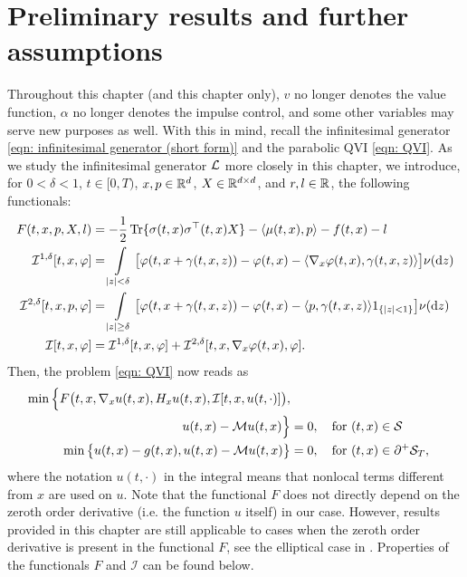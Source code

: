 \section{Preliminary results and further assumptions}
\label{section: Preliminary Results for the Proof of Uniqueness}
Throughout this chapter (and this chapter only), $v$ no longer denotes the value function, $\alpha$ no longer denotes the impulse control, and some other variables may serve new purposes as well. With this in mind, recall the infinitesimal generator \eqref{eqn: infinitesimal generator (short form)} and the parabolic QVI \eqref{eqn: QVI}. As we study the infinitesimal generator $\mathcal{L}$ more closely in this chapter, we introduce, for $0<\delta<1$, $t \in [0,T)$, $x,p \in \mathbb{R}^d$, $X \in \mathbb{R}^{d \times d}$, and $r,l \in \mathbb{R}$, the following functionals:
\begin{align}
    F(t,x,p,X,l) &= - \frac{1}{2} \operatorname{Tr}\{ \sigma (t,x) \sigma^\top (t,x) X \} - \langle \mu (t,x), p \rangle - f(t,x) - l \label{eqn: functional F} \\
    \mathcal{I}^{1,\delta}[t,x,\varphi] &= \int\limits_{|z|<\delta} \big[ \varphi(t,x+\gamma(t,x,z)) - \varphi(t,x) - \langle \nabla_x \varphi (t,x), \gamma(t,x,z) \rangle \big] \nu(\mathrm{d} z) \label{eqn: functional I1} \\
    \mathcal{I}^{2,\delta}[t,x,p,\varphi] &= \int\limits_{|z|\geq \delta} \big[ \varphi(t,x+\gamma(t,x,z)) - \varphi(t,x) - \langle p, \gamma(t,x,z) \rangle 1_{\left\{|z|<1\right\}} \big] \nu(\mathrm{d} z) \label{eqn: functional I2} \\
    \mathcal{I}[t,x,\varphi] &= \mathcal I^{1,\delta}[t,x,\varphi] + \mathcal  I^{2,\delta}[t,x,\nabla_x \varphi(t,x),\varphi]. \label{eqn: functional I} 
\end{align}
Then, the problem \ref{eqn: QVI} now reads as
\begin{align}
    \min \Big \{ F\big(t,x, \nabla_x u(t,x), H_x u(t,x), \mathcal{I}[t,x,u(t,\cdot)]\big), \nonumber \\
    u(t,x) - \mathcal{M} u(t,x) \Big\} &= 0, \quad \text{for } (t,x) \in \mathcal{S} \nonumber \\
    \min \big\{ u(t,x) - g(t,x), u(t,x) - \mathcal{M} u(t,x) \big\} &= 0, \quad \text{for } (t,x) \in \partial^+ \mathcal{S}_T,
    \label{eqn: QVI with functionals}
\end{align}
where the notation $u(t, \cdot)$ in the integral means that nonlocal terms different from $x$ are used on $u$. Note that the functional $F$ does not directly depend on the zeroth order derivative (i.e. the function $u$ itself) in our case. However, results provided in this chapter are still applicable to cases when the zeroth order derivative is present in the functional $F$, see the elliptical case in \cite[Section 5]{seydel2010generalexistenceuniquenessviscosity}. Properties of the functionals $F$ and $\mathcal{I}$ can be found below.
